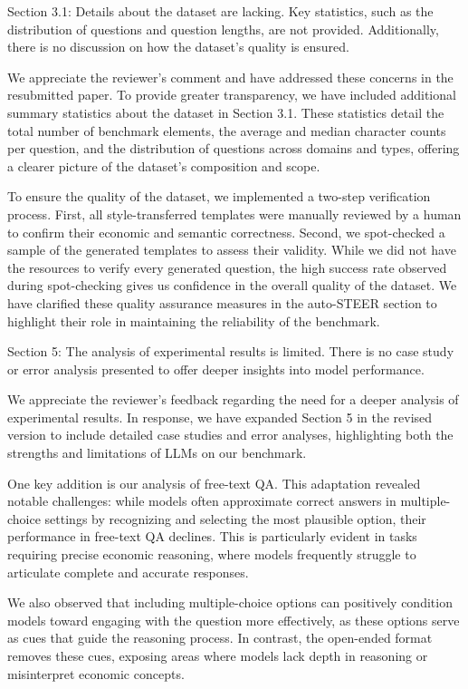 \documentclass[12pt]{rebuttal_style}
\begin{document}
\begin{revcomment}
    Section 3.1: Details about the dataset are lacking. Key statistics, such as the distribution of questions and question lengths, are not provided. Additionally, there is no discussion on how the dataset's quality is ensured.
\end{revcomment}
\begin{response}
    We appreciate the reviewer's comment and have addressed these concerns in the resubmitted paper. To provide greater transparency, we have included additional summary statistics about the dataset in Section 3.1. These statistics detail the total number of benchmark elements, the average and median character counts per question, and the distribution of questions across domains and types, offering a clearer picture of the dataset’s composition and scope.

    To ensure the quality of the dataset, we implemented a two-step verification process. First, all style-transferred templates were manually reviewed by a human to confirm their economic and semantic correctness. Second, we spot-checked a sample of the generated templates to assess their validity. While we did not have the resources to verify every generated question, the high success rate observed during spot-checking gives us confidence in the overall quality of the dataset. We have clarified these quality assurance measures in the auto-STEER section to highlight their role in maintaining the reliability of the benchmark. 
\end{response}

\begin{revcomment}
    Section 5: The analysis of experimental results is limited. There is no case study or error analysis presented to offer deeper insights into model performance.
\end{revcomment}
\begin{response}
We appreciate the reviewer’s feedback regarding the need for a deeper analysis of experimental results. In response, we have expanded Section 5 in the revised version to include detailed case studies and error analyses, highlighting both the strengths and limitations of LLMs on our benchmark.

One key addition is our analysis of free-text QA. This adaptation revealed notable challenges: while models often approximate correct answers in multiple-choice settings by recognizing and selecting the most plausible option, their performance in free-text QA declines. This is particularly evident in tasks requiring precise economic reasoning, where models frequently struggle to articulate complete and accurate responses.

We also observed that including multiple-choice options can positively condition models toward engaging with the question more effectively, as these options serve as cues that guide the reasoning process. In contrast, the open-ended format removes these cues, exposing areas where models lack depth in reasoning or misinterpret economic concepts.
\end{response}
\end{document}

